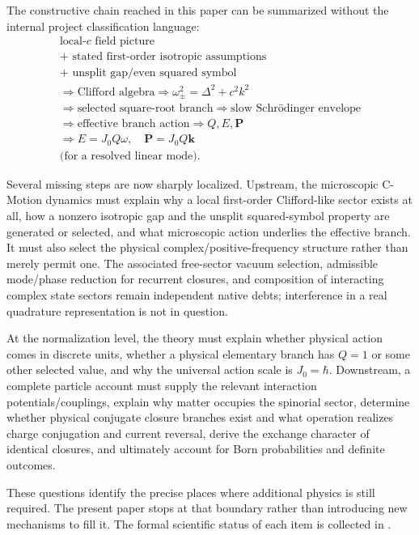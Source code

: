 \documentclass[11pt]{article}
\theoremstyle{definition}
\begin{document}
The constructive chain reached in this paper can be summarized without the internal project
classification language:
\begin{equation}
\boxed{
\begin{gathered}
\text{local-$c$ field picture}\\
+\text{ stated first-order isotropic assumptions}\\
+\text{ unsplit gap/even squared symbol}\\
\Longrightarrow\text{Clifford algebra}
\Longrightarrow\omega_\pm^2=\Delta^2+c^2k^2\\
\Longrightarrow\text{selected square-root branch}
\Longrightarrow\text{slow Schrödinger envelope}\\
\Longrightarrow\text{effective branch action}
\Longrightarrow Q,E,\mathbf P\\
\Longrightarrow E=J_0Q\omega,\quad \mathbf P=J_0Q\mathbf k\\
\text{(for a resolved linear mode).}
\end{gathered}}
\label{eq:constructivespine}
\end{equation}

Several missing steps are now sharply localized.  Upstream, the microscopic C-Motion dynamics
must explain why a local first-order Clifford-like sector exists at all, how a nonzero
isotropic gap and the unsplit squared-symbol property are generated or selected, and what
microscopic action underlies the effective branch.  It must also select the physical complex/positive-frequency structure rather than
merely permit one.  The associated free-sector vacuum selection, admissible
mode/phase reduction for recurrent closures, and composition of interacting
complex state sectors remain independent native debts; interference in a real
quadrature representation is not in question.

At the normalization level, the theory must explain whether physical action comes in discrete
units, whether a physical elementary branch has $Q=1$ or some other selected value, and why
the universal action scale is $J_0=\hbar$.  Downstream, a complete particle account must supply
the relevant interaction potentials/couplings, explain why matter occupies the spinorial
sector, determine whether physical conjugate closure branches exist and what operation realizes
charge conjugation and current reversal, derive the exchange character of identical closures,
and ultimately account for Born probabilities and definite outcomes.

These questions identify the precise places where additional physics is still required.  The
present paper stops at that boundary rather than introducing new mechanisms to fill it.  The
formal scientific status of each item is collected in .
\end{document}
